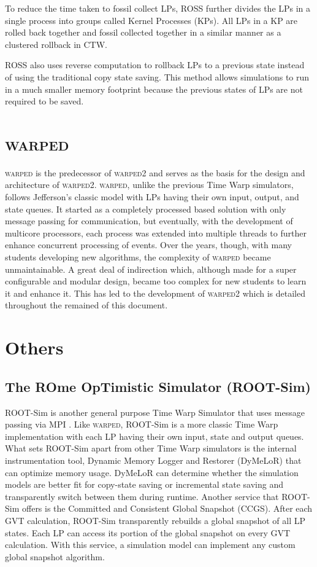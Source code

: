 \documentclass[11pt]{book}
\begin{document}
To reduce the time taken to fossil collect LPs, ROSS further divides the LPs in a single process
into groups called Kernel Processes (KPs).  All LPs in a KP are rolled back together and fossil
collected together in a similar manner as a clustered rollback in CTW.

ROSS also uses reverse computation\cite{carothers-99} to rollback LPs to a previous state instead
of using the traditional copy state saving.  This method allows simulations to run in a much smaller
memory footprint because the previous states of LPs are not required to be saved.

\section{\textsc{warped}}

\textsc{warped} is the predecessor of \textsc{warped2} and serves as the basis for the design
and architecture of \textsc{warped2}.  \textsc{warped}, unlike the previous Time Warp simulators,
follows Jefferson's classic model with LPs having their own input, output, and state queues.  It
started as a completely processed based solution with only message passing for communication,
but eventually, with the development of multicore processors, each process was extended into
multiple threads to further enhance concurrent processing of events.  Over the years, though, with
many students developing new algorithms, the complexity of \textsc{warped} became unmaintainable.
A great deal of indirection which, although made for a super configurable and modular
design, became too complex for new students to learn it and enhance it.  This has led to the
development of \textsc{warped2} which is detailed throughout the remained of this document.

\section{Others}

\subsection{The ROme OpTimistic Simulator (ROOT-Sim)}

ROOT-Sim is another general purpose Time Warp Simulator that uses message passing via MPI
\cite{pellegrini-11}.  Like \textsc{warped}, ROOT-Sim is a more classic Time Warp
implementation with each LP having their own input, state and output queues.  What sets
ROOT-Sim apart from other Time Warp simulators is the internal instrumentation tool, Dynamic
Memory Logger and Restorer (DyMeLoR) that can optimize memory usage.  DyMeLoR can determine
whether the simulation models are better fit for copy-state saving or incremental state
saving and transparently switch between them during runtime.  Another service that ROOT-Sim
offers is the Committed and Consistent Global Snapshot (CCGS).  After each GVT calculation,
ROOT-Sim transparently rebuilds a global snapshot of all LP states.  Each LP can access its
portion of the global snapshot on every GVT calculation.  With this service, a simulation
model can implement any custom global snapshot algorithm.
\end{document}
